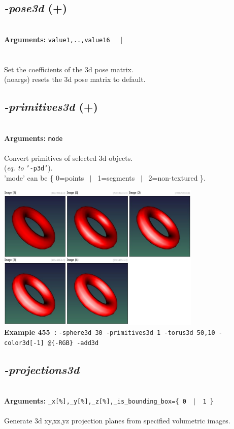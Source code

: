 \documentclass[a4paper,11pt,twoside]{book}
\begin{document}
\subsection{\emph{-pose3d} (+)}\vspace*{-0.5em}
~\\\textbf{Arguments: } 
{\small \texttt{value1,..,value16}}~~~$|$\\
\\~\\
Set the coefficients of the 3d pose matrix.
~\\(noargs) resets the 3d pose matrix to default.


\subsection{\emph{-primitives3d} (+)}\vspace*{-0.5em}
~\\\textbf{Arguments: } 
{\small \texttt{mode}}\\~\\
Convert primitives of selected 3d objects.
~\\(\emph{eq. to} {\small \texttt{'-p3d'}}).
~\\'mode' can be \{ 0=points ~$|$~ 1=segments ~$|$~ 2=non-textured \}.
\begin{center}\includegraphics[keepaspectratio=true,height=7cm,width=\textwidth]{img/gmic_def455.jpg}\\
{\footnotesize \textbf{Example 455~:} \texttt{-sphere3d 30 -primitives3d 1 -torus3d 50,10 -color3d[-1] @\{-RGB\} -add3d}}
\end{center}

\subsection{\emph{-projections3d} }\vspace*{-0.5em}
~\\\textbf{Arguments: } 
{\small \texttt{\_x[\%],\_y[\%],\_z[\%],\_is\_bounding\_box=\{ 0 ~$|$~ 1 \}}}\\~\\
Generate 3d xy,xz,yz projection planes from specified volumetric images.
\end{document}
